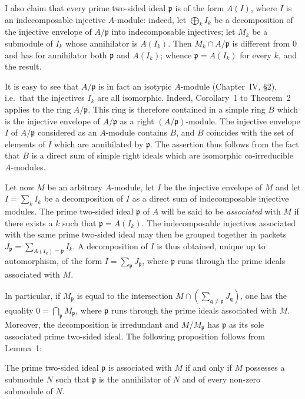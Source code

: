 I also claim that every prime two-sided ideal $\mathfrak{p}$ is of the
form $A(I)$, where $I$ is an indecomposable injective $A$-module:
indeed, let $\bigoplus_k I_k$ be a decomposition of the injective
envelope of $A/\mathfrak{p}$ into indecomposable injectives; let $M_k$
be a submodule of $I_k$ whose annihilator is $A(I_k)$. Then
$M_k \cap A/\mathfrak{p}$ is different from $0$ and has for annihilator
both $\mathfrak{p}$ and $A(I_k)$; whence $\mathfrak{p} = A(I_k)$ for
every $k$, and the result.

It is easy to see that $A/\mathfrak{p}$ is in fact an isotypic
$A$-module (Chapter~IV, \S2), i.e.\ that the injectives $I_k$ are all
isomorphic. Indeed, Corollary~1 to Theorem~2 applies to the ring
$A/\mathfrak{p}$. This ring is therefore contained in a simple ring $B$
which is the injective envelope of $A/\mathfrak{p}$ as a right
$(A/\mathfrak{p})$-module. The injective envelope $I$ of $A/\mathfrak{p}$
considered as an $A$-module contains $B$, and $B$ coincides with the set
of elements of $I$ which are annihilated by $\mathfrak{p}$. The
assertion thus follows from the fact that $B$ is a direct sum of simple
right ideals which are isomorphic co-irreducible $A$-modules.

Let now $M$ be an arbitrary $A$-module, let $I$ be the injective
envelope of $M$ and let $I = \sum_k I_k$ be a decomposition of $I$ as a
direct sum of indecomposable injective modules. The prime two-sided
ideal $\mathfrak{p}$ of $A$ will be said to be \emph{associated} with
$M$ if there exists a $k$ such that $\mathfrak{p} = A(I_k)$. The
indecomposable injectives associated with the same prime two-sided
ideal may then be grouped together in packets
$J_{\mathfrak{p}} = \sum_{A(I_k) = \mathfrak{p}} I_k$. A decomposition
of $I$ is thus obtained, unique up to automorphism, of the form
$I = \sum_{\mathfrak{p}} J_{\mathfrak{p}}$, where $\mathfrak{p}$ runs
through the prime ideals associated with $M$.

In particular, if $M_{\mathfrak{p}}$ is equal to the intersection
$M \cap \left(\sum_{\mathfrak{q} \ne \mathfrak{p}} J_{\mathfrak{q}}\right)$,
one has the equality $0 = \bigcap_{\mathfrak{p}} M_{\mathfrak{p}}$,
where $\mathfrak{p}$ runs through the prime ideals associated with $M$.
Moreover, the decomposition is irredundant and $M/M_{\mathfrak{p}}$ has
$\mathfrak{p}$ as its sole associated prime two-sided ideal. The
following proposition follows from Lemma~1:

\begin{proposition}
The prime two-sided ideal $\mathfrak{p}$ is associated with $M$ if and
only if $M$ possesses a submodule $N$ such that $\mathfrak{p}$ is the
annihilator of $N$ and of every non-zero submodule of $N$.
\end{proposition}

